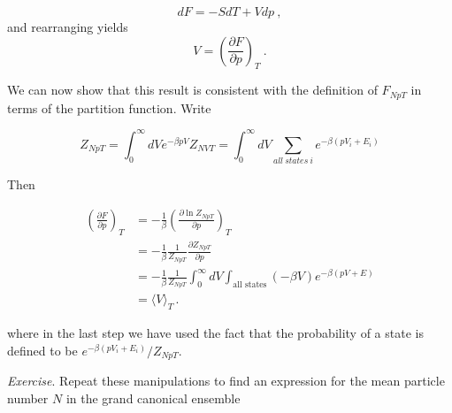 \documentclass[
  letterpaper,
  DIV=11,
  numbers=noendperiod]{scrreprt}
\begin{document}
\[
dF=-SdT+Vdp\:,
\] and rearranging yields \[
V=\left(\frac{\partial F}{\partial p}\right)_T\:.
\]

We can now show that this result is consistent with the definition of
\(F_{NpT}\) in terms of the partition function. Write

\[
Z_{NpT}=\int_0^\infty dV  e^{-\beta p V}Z_{NVT}=\int_0^\infty dV\sum_{all~states~i}e^{-\beta (p V_i+E_i)}
\]

Then

\begin{align}
\left(\frac{\partial F}{\partial p}\right)_T
&= -\frac{1}{\beta} \left(\frac{\partial \ln Z_{NpT}}{\partial p}\right)_T \\
&= -\frac{1}{\beta} \frac{1}{Z_{NpT}} \frac{\partial Z_{NpT}}{\partial p} \\
&= -\frac{1}{\beta} \frac{1}{Z_{NpT}} \int_0^\infty dV \int_{\text{all states}} (-\beta V) e^{-\beta (p V + E)} \\
&= \langle V \rangle_T \,.
\end{align}

where in the last step we have used the fact that the probability of a
state is defined to be \(e^{-\beta (p V_i+E_i)}/Z_{NpT}\).

\emph{Exercise}. Repeat these manipulations to find an expression for
the mean particle number \(N\) in the grand canonical ensemble
\end{document}
